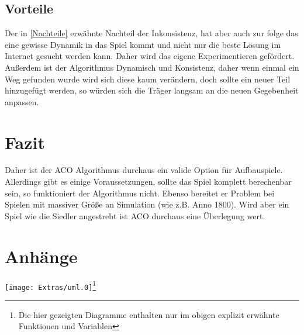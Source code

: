 \documentclass[12pt]{article}
\begin{document}
\subsection{Vorteile}
Der in \ref{Nachteile} erwähnte Nachteil der Inkonsistenz, hat aber auch zur folge das eine gewisse Dynamik in das Spiel kommt und nicht nur die beste Lösung im Internet gesucht werden kann. Daher wird das eigene Experimentieren gefördert.
Außerdem ist der Algorithmus Dynamisch und Konsistenz, daher wenn einmal ein Weg gefunden wurde wird sich diese kaum verändern, doch sollte ein neuer Teil hinzugefügt werden, so würden sich die Träger langsam an die neuen Gegebenheit anpassen.
\section{Fazit}
Daher ist der ACO Algorithmus durchaus ein valide Option für Aufbauspiele. Allerdings gibt es einige Voraussetzungen, sollte das Spiel komplett berechenbar sein, so funktioniert der Algorithmus nicht. Ebenso bereitet er Problem bei Spielen mit massiver Größe an Simulation (wie z.B. Anno 1800).
Wird aber ein Spiel wie die Siedler angestrebt ist ACO durchaus eine Überlegung wert.


\section{Anhänge}
\begin{center}
\texttt{[image: Extras/uml.0]}\footnote{Die hier gezeigten Diagramme enthalten nur im obigen explizit erwähnte Funktionen und Variablen}
\end{center}
\printbibliography[heading=bibnumbered]
\end{document}
